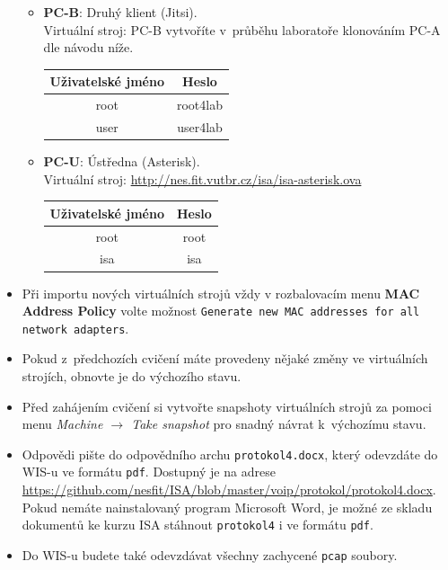 \begin{itemize}
\begin{itemize}
	\item \textbf{PC-B}: Druhý klient (Jitsi).\\
	Virtuální stroj: PC-B vytvoříte v~průběhu laboratoře klonováním PC-A dle návodu níže.
	\begin{table}[H]
		\centering
		\begin{tabular}{|c|c|}
		\hline
		\textbf{Uživatelské jméno} & \textbf{Heslo} \\ \hline
		root                       & root4lab       \\ \hline
		user                       & user4lab       \\ \hline
		\end{tabular}
	\end{table}
	\item \textbf{PC-U}: Ústředna (Asterisk).\\
	Virtuální stroj: \url{http://nes.fit.vutbr.cz/isa/isa-asterisk.ova}
	\begin{table}[H]
		\centering
		\begin{tabular}{|c|c|}
		\hline
		\textbf{Uživatelské jméno} & \textbf{Heslo} \\ \hline
		root                       & root       \\ \hline
		isa                       & isa       \\ \hline
		\end{tabular}
	\end{table}
  \end{itemize}
  \item Při importu nových virtuálních strojů vždy v rozbalovacím menu \textbf{MAC Address Policy} volte možnost \texttt{Generate new MAC addresses for all network adapters}.
  \item Pokud z~předchozích cvičení máte provedeny nějaké změny ve virtuálních strojích, obnovte je do výchozího stavu.
  \item Před zahájením cvičení si vytvořte snapshoty virtuálních strojů za pomoci
  menu \textit{Machine $\rightarrow$ Take snapshot} pro snadný návrat k~výchozímu stavu.
  \item Odpovědi pište do odpovědního archu \texttt{protokol4.docx}, který odevzdáte do WIS-u ve formátu \texttt{pdf}.
  Dostupný je na adrese\\
  \url{https://github.com/nesfit/ISA/blob/master/voip/protokol/protokol4.docx}.\\
  Pokud nemáte nainstalovaný program Microsoft Word, je možné ze skladu dokumentů ke kurzu ISA stáhnout \texttt{protokol4} i ve formátu \texttt{pdf}.
  \item Do WIS-u budete také odevzdávat všechny zachycené \texttt{pcap} soubory.
\end{itemize}


